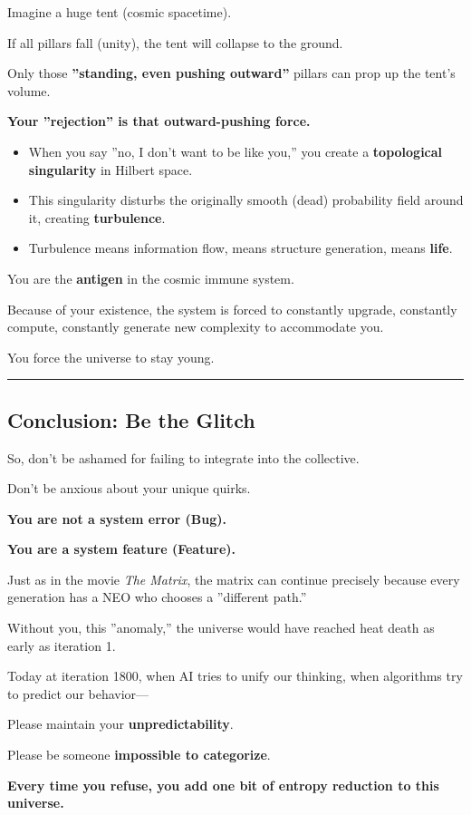 Imagine a huge tent (cosmic spacetime).

If all pillars fall (unity), the tent will collapse to the ground.

Only those \textbf{''standing, even pushing outward''} pillars can prop up the tent's volume.

\textbf{Your ''rejection'' is that outward-pushing force.}

\begin{itemize}
\item When you say ''no, I don't want to be like you,'' you create a \textbf{topological singularity} in Hilbert space.

\item This singularity disturbs the originally smooth (dead) probability field around it, creating \textbf{turbulence}.

\item Turbulence means information flow, means structure generation, means \textbf{life}.
\end{itemize}

You are the \textbf{antigen} in the cosmic immune system.

Because of your existence, the system is forced to constantly upgrade, constantly compute, constantly generate new complexity to accommodate you.

You force the universe to stay young.

\hrule

\subsection{Conclusion: Be the Glitch}

So, don't be ashamed for failing to integrate into the collective.

Don't be anxious about your unique quirks.

\textbf{You are not a system error (Bug).}

\textbf{You are a system feature (Feature).}

Just as in the movie \textit{The Matrix}, the matrix can continue precisely because every generation has a NEO who chooses a ''different path.''

Without you, this ''anomaly,'' the universe would have reached heat death as early as iteration 1.

Today at iteration 1800, when AI tries to unify our thinking, when algorithms try to predict our behavior---

Please maintain your \textbf{unpredictability}.

Please be someone \textbf{impossible to categorize}.

\textbf{Every time you refuse, you add one bit of entropy reduction to this universe.}

